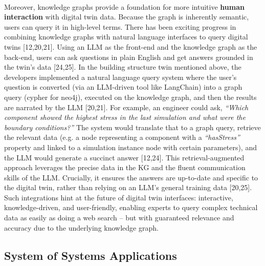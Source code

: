         \paragraph{} Moreover, knowledge graphs provide a foundation for more intuitive \textbf{human interaction} with digital twin data. Because the graph is inherently semantic, users can query it in high-level terms. There has been exciting progress in combining knowledge graphs with natural language interfaces to query digital twins [12,20,21]. Using an LLM as the front-end and the knowledge graph as the back-end, users can ask questions in plain English and get answers grounded in the twin’s data [24,25]. In the building structure twin mentioned above, the developers implemented a natural language query system where the user’s question is converted (via an LLM-driven tool like LangChain) into a graph query (cypher for neo4j), executed on the knowledge graph, and then the results are narrated by the LLM [20,21]. For example, an engineer could ask, \textit{“Which component showed the highest stress in the last simulation and what were the boundary conditions?”} The system would translate that to a graph query, retrieve the relevant data (e.g. a node representing a component with a \textit{“hasStress”} property and linked to a simulation instance node with certain parameters), and the LLM would generate a succinct answer [12,24]. This retrieval-augmented approach leverages the precise data in the KG and the fluent communication skills of the LLM. Crucially, it ensures the answers are up-to-date and specific to the digital twin, rather than relying on an LLM’s general training data [20,25]. Such integrations hint at the future of digital twin interfaces: interactive, knowledge-driven, and user-friendly, enabling experts to query complex technical data as easily as doing a web search – but with guaranteed relevance and accuracy due to the underlying knowledge graph.
        
    \subsection{System of Systems Applications}

